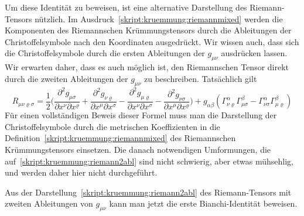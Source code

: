 Um diese Identität zu beweisen, ist eine alternative Darstellung des
Riemann-Tensors nützlich. 
Im Ausdruck~\eqref{skript:kruemmung:riemannmixed} werden die Komponenten
des Riemannschen Krümmungstensors durch die Ableitungen der Christoffelsymbole
nach den Koordinaten ausgedrückt.
Wir wissen auch, dass sich die Christoffelsymbole durch die ersten Ableitungen
der $g_{\mu\nu}$ ausdrücken lassen.
Wir erwarten daher, dass es auch möglich ist, den Riemannschen Tensor direkt
durch die zweiten Ableitungen der $g_{\mu\nu}$ zu beschreiben.
Tatsächlich gilt
\begin{equation}
R_{\mu\nu\varrho\sigma}
=
\frac12\biggl(
\frac{\partial^2 g_{\mu\sigma}}{\partial x^\nu\partial x^\varrho}
+
\frac{\partial^2 g_{\nu\varrho}}{\partial x^\mu\partial x^\sigma}
-
\frac{\partial^2 g_{\mu\varrho}}{\partial x^\nu\partial x^\sigma}
-
\frac{\partial^2 g_{\nu\sigma}}{\partial x^\mu\partial x^\varrho}
\biggr)
+g_{\alpha\beta}(
\Gamma^\alpha_{\nu\varrho}\Gamma^\beta_{\mu\sigma}
- \Gamma^\alpha_{\nu\sigma}\Gamma^\beta_{\mu\varrho}
)
\label{skript:kruemmung:riemann2abl}
\end{equation}
Für einen vollständigen Beweis dieser Formel muss man die Darstellung
der Christoffelsymbole durch die metrischen Koeffizienten in die
Definition~\eqref{skript:kruemmung:riemannmixed} des Riemannschen
Krümmungstensors einsetzen.
Die danach notwendigen Umformungen, die
auf~\eqref{skript:kruemmung:riemann2abl}
sind nicht schwierig, aber etwas mühsehlig, und werden daher hier
nicht durchgeführt.

Aus der Darstellung~\eqref{skript:kruemmung:riemann2abl} des Riemann-Tensors
mit zweiten Ableitungen von $g_{\mu\nu}$ kann man jetzt die erste
Bianchi-Identität beweisen.

